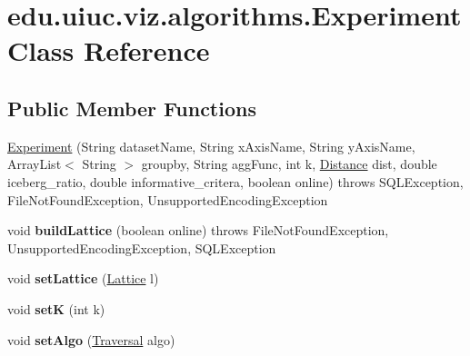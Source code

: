 \hypertarget{classedu_1_1uiuc_1_1viz_1_1algorithms_1_1_experiment}{}\section{edu.\+uiuc.\+viz.\+algorithms.\+Experiment Class Reference}
\label{classedu_1_1uiuc_1_1viz_1_1algorithms_1_1_experiment}
\subsection*{Public Member Functions}
\begin{DoxyCompactItemize}
\item 
\mbox{\hyperlink{classedu_1_1uiuc_1_1viz_1_1algorithms_1_1_experiment_a6e1595f762646d6ae4576f8dd8825120}{Experiment}} (String dataset\+Name, String x\+Axis\+Name, String y\+Axis\+Name, Array\+List$<$ String $>$ groupby, String agg\+Func, int k, \mbox{\hyperlink{interfaceedu_1_1uiuc_1_1viz_1_1distance_1_1_distance}{Distance}} dist, double iceberg\+\_\+ratio, double informative\+\_\+critera, boolean online)  throws S\+Q\+L\+Exception, File\+Not\+Found\+Exception, Unsupported\+Encoding\+Exception 
\item 
\mbox{\label{classedu_1_1uiuc_1_1viz_1_1algorithms_1_1_experiment_a15fe657fc7616ca90b068fc0255acc92}} 
void {\bfseries build\+Lattice} (boolean online)  throws File\+Not\+Found\+Exception, Unsupported\+Encoding\+Exception, S\+Q\+L\+Exception 
\item 
\mbox{\label{classedu_1_1uiuc_1_1viz_1_1algorithms_1_1_experiment_ac3c308465ae6adc732e42fb5cb3281b9}} 
void {\bfseries set\+Lattice} (\mbox{\hyperlink{classedu_1_1uiuc_1_1viz_1_1lattice_1_1_lattice}{Lattice}} l)
\item 
\mbox{\label{classedu_1_1uiuc_1_1viz_1_1algorithms_1_1_experiment_af16eb03743927a854fc45d62632dba5b}} 
void {\bfseries setK} (int k)
\item 
\mbox{\label{classedu_1_1uiuc_1_1viz_1_1algorithms_1_1_experiment_ae982382f4efbb8fe0e0ff13c42b229c5}} 
void {\bfseries set\+Algo} (\mbox{\hyperlink{classedu_1_1uiuc_1_1viz_1_1algorithms_1_1_traversal}{Traversal}} algo)

\end{DoxyCompactItemize}
